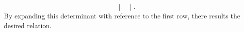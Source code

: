 \begin{exercises}
\begin{answer}
\begin{equation*}
\begin{vmatrix}
        \end{vmatrix}.
      \end{equation*}
      By expanding this determinant with reference to the first row, there
      results the desired relation.  
    \end{answer}
\end{exercises}
